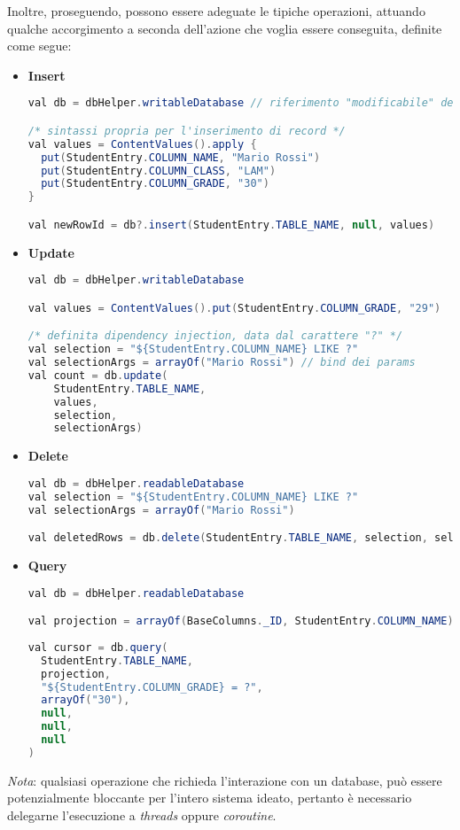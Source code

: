 \documentclass{article}
\begin{document}
Inoltre, proseguendo, possono essere adeguate le tipiche operazioni, attuando qualche accorgimento a seconda dell'azione che voglia essere conseguita, definite come segue:
\begin{itemize}[label={-}]
  \itemsep0em
  \item \textbf{Insert}
  \begin{lstlisting}[language=JAVA]
val db = dbHelper.writableDatabase // riferimento "modificabile" del database

/* sintassi propria per l'inserimento di record */
val values = ContentValues().apply { 
  put(StudentEntry.COLUMN_NAME, "Mario Rossi")
  put(StudentEntry.COLUMN_CLASS, "LAM")
  put(StudentEntry.COLUMN_GRADE, "30")
}

val newRowId = db?.insert(StudentEntry.TABLE_NAME, null, values)
  \end{lstlisting}
  \item \textbf{Update}
  \begin{lstlisting}[language=JAVA]
val db = dbHelper.writableDatabase

val values = ContentValues().put(StudentEntry.COLUMN_GRADE, "29")

/* definita dipendency injection, data dal carattere "?" */
val selection = "${StudentEntry.COLUMN_NAME} LIKE ?"
val selectionArgs = arrayOf("Mario Rossi") // bind dei params
val count = db.update(
    StudentEntry.TABLE_NAME,
    values,
    selection,
    selectionArgs)
  \end{lstlisting}
  \item \textbf{Delete}
  \begin{lstlisting}[language=JAVA]
val db = dbHelper.readableDatabase
val selection = "${StudentEntry.COLUMN_NAME} LIKE ?"
val selectionArgs = arrayOf("Mario Rossi")

val deletedRows = db.delete(StudentEntry.TABLE_NAME, selection, selectionArgs)
  \end{lstlisting}
  \item \textbf{Query}
  \begin{lstlisting}[language=JAVA]
val db = dbHelper.readableDatabase

val projection = arrayOf(BaseColumns._ID, StudentEntry.COLUMN_NAME)
    
val cursor = db.query( 
  StudentEntry.TABLE_NAME,
  projection, 
  "${StudentEntry.COLUMN_GRADE} = ?",
  arrayOf("30"), 
  null, 
  null, 
  null
)
  \end{lstlisting}
\end{itemize}
\textit{Nota}: qualsiasi operazione che richieda l'interazione con un database, può essere potenzialmente bloccante per l'intero sistema ideato, pertanto è necessario delegarne l'esecuzione a \textit{threads} oppure \textit{coroutine}.\vspace*{7pt}\\
\end{document}
